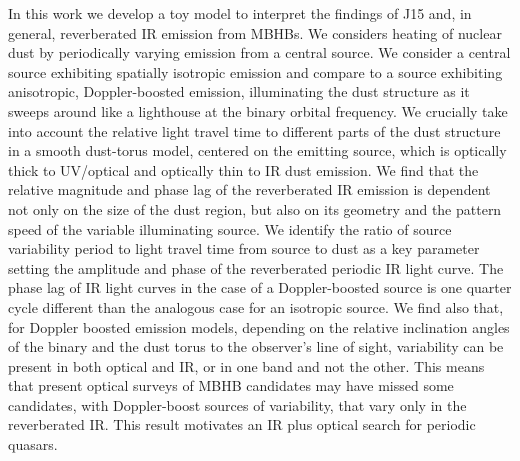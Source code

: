 In this work we develop a toy model to interpret the findings of J15 and, in
general, reverberated IR emission from MBHBs. We considers heating of nuclear
dust by periodically varying emission from a central source. We consider a
central source exhibiting spatially isotropic emission and compare to a source
exhibiting anisotropic, Doppler-boosted emission, illuminating the dust
structure as it sweeps around like a lighthouse at the binary orbital
frequency. We crucially take into account the relative light travel time to
different parts of the dust structure in a smooth dust-torus model, centered
on the emitting source, which is optically thick to UV/optical and optically
thin to IR dust emission. We find that the relative magnitude and phase lag of
the reverberated IR emission is dependent not only on the size of the dust
region, but also on its geometry and the pattern speed of the variable
illuminating source. We identify the ratio of source variability period to
light travel time from source to dust as a key parameter setting the amplitude
and phase of the reverberated periodic IR light curve. The phase lag of IR
light curves in the case of a Doppler-boosted source is one quarter cycle
different than the analogous case for an isotropic source. We find also that,
for Doppler boosted emission models, depending on the relative inclination
angles of the binary and the dust torus to the observer's line of sight,
variability can be present in both optical and IR, or in one band and not the
other. This means that present optical surveys of MBHB candidates may have
missed some candidates, with Doppler-boost sources of variability, that vary
only in the reverberated IR. This result motivates an IR plus optical search
for periodic quasars.





